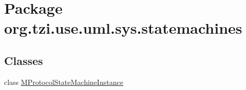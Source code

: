 \hypertarget{namespaceorg_1_1tzi_1_1use_1_1uml_1_1sys_1_1statemachines}{\section{Package org.\-tzi.\-use.\-uml.\-sys.\-statemachines}
\label{namespaceorg_1_1tzi_1_1use_1_1uml_1_1sys_1_1statemachines}
}
\subsection*{Classes}
\begin{DoxyCompactItemize}
\item 
class \hyperlink{classorg_1_1tzi_1_1use_1_1uml_1_1sys_1_1statemachines_1_1_m_protocol_state_machine_instance}{M\-Protocol\-State\-Machine\-Instance}
\end{DoxyCompactItemize}

